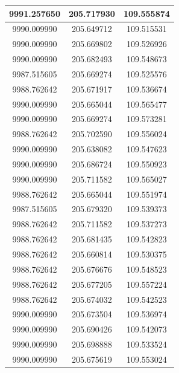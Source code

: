 \documentclass[a4paper,14pt]{article}
\begin{document}
\begin{longtable}[c]{|c|c|c|}
	9991.257650       & 205.717930           & 109.555874        \\ \hline
	9990.009990       & 205.649712           & 109.515531        \\ \hline
	9990.009990       & 205.669802           & 109.526926        \\ \hline
	9990.009990       & 205.682493           & 109.548673        \\ \hline
	9987.515605       & 205.669274           & 109.525576        \\ \hline
	9988.762642       & 205.671917           & 109.536674        \\ \hline
	9990.009990       & 205.665044           & 109.565477        \\ \hline
	9990.009990       & 205.669274           & 109.573281        \\ \hline
	9988.762642       & 205.702590           & 109.556024        \\ \hline
	9990.009990       & 205.638082           & 109.547623        \\ \hline
	9990.009990       & 205.686724           & 109.550923        \\ \hline
	9990.009990       & 205.711582           & 109.565027        \\ \hline
	9988.762642       & 205.665044           & 109.551974        \\ \hline
	9987.515605       & 205.679320           & 109.539373        \\ \hline
	9988.762642       & 205.711582           & 109.537273        \\ \hline
	9988.762642       & 205.681435           & 109.542823        \\ \hline
	9988.762642       & 205.660814           & 109.530375        \\ \hline
	9988.762642       & 205.676676           & 109.548523        \\ \hline
	9988.762642       & 205.677205           & 109.557224        \\ \hline
	9988.762642       & 205.674032           & 109.542523        \\ \hline
	9990.009990       & 205.673504           & 109.536974        \\ \hline
	9990.009990       & 205.690426           & 109.542073        \\ \hline
	9990.009990       & 205.698888           & 109.533524        \\ \hline
	9990.009990       & 205.675619           & 109.553024        \\ \hline

\end{longtable}
\end{document}
